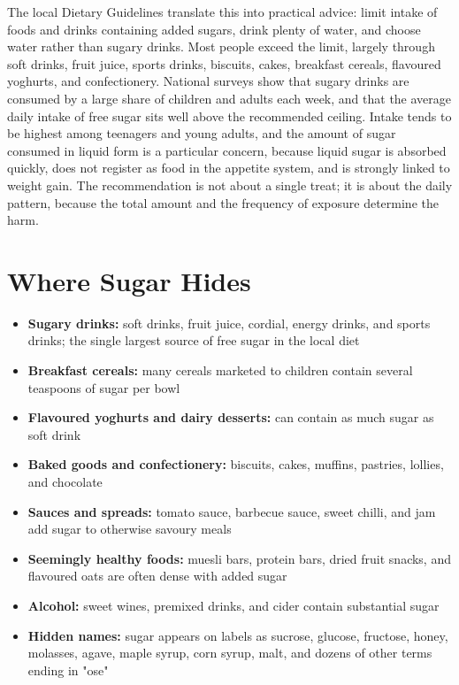 The local Dietary Guidelines translate this into practical advice: limit intake of foods and drinks containing added sugars, drink plenty of water, and choose water rather than sugary drinks. Most people exceed the limit, largely through soft drinks, fruit juice, sports drinks, biscuits, cakes, breakfast cereals, flavoured yoghurts, and confectionery. National surveys show that sugary drinks are consumed by a large share of children and adults each week, and that the average daily intake of free sugar sits well above the recommended ceiling. Intake tends to be highest among teenagers and young adults, and the amount of sugar consumed in liquid form is a particular concern, because liquid sugar is absorbed quickly, does not register as food in the appetite system, and is strongly linked to weight gain. The recommendation is not about a single treat; it is about the daily pattern, because the total amount and the frequency of exposure determine the harm.

\section*{Where Sugar Hides}
\begin{itemize}
    \item \textbf{Sugary drinks:} soft drinks, fruit juice, cordial, energy drinks, and sports drinks; the single largest source of free sugar in the local diet
    \item \textbf{Breakfast cereals:} many cereals marketed to children contain several teaspoons of sugar per bowl
    \item \textbf{Flavoured yoghurts and dairy desserts:} can contain as much sugar as soft drink
    \item \textbf{Baked goods and confectionery:} biscuits, cakes, muffins, pastries, lollies, and chocolate
    \item \textbf{Sauces and spreads:} tomato sauce, barbecue sauce, sweet chilli, and jam add sugar to otherwise savoury meals
    \item \textbf{Seemingly healthy foods:} muesli bars, protein bars, dried fruit snacks, and flavoured oats are often dense with added sugar
    \item \textbf{Alcohol:} sweet wines, premixed drinks, and cider contain substantial sugar
    \item \textbf{Hidden names:} sugar appears on labels as sucrose, glucose, fructose, honey, molasses, agave, maple syrup, corn syrup, malt, and dozens of other terms ending in "ose"
\end{itemize}


